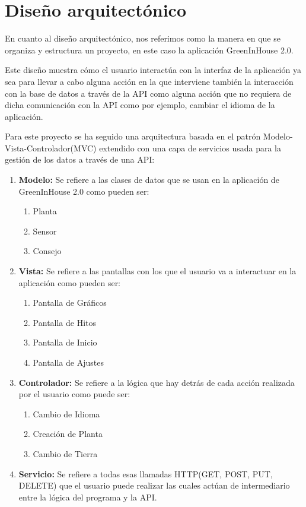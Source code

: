 \section{Diseño arquitectónico}
En cuanto al diseño arquitectónico, nos referimos como la manera en que se organiza y estructura un proyecto, en este caso la aplicación GreenInHouse 2.0.

Este diseño muestra cómo el usuario interactúa con la interfaz de la aplicación ya sea para llevar a cabo alguna acción en la que interviene también la interacción con la base de datos a través de la API como alguna acción que no requiera de dicha comunicación con la API como por ejemplo, cambiar el idioma de la aplicación.

Para este proyecto se ha seguido una arquitectura basada en el patrón Modelo-Vista-Controlador(MVC) extendido con una capa de servicios usada para la gestión de los datos a través de una API:
\begin{enumerate}
    \item \textbf{Modelo:}
   Se refiere a las clases de datos que se usan en la aplicación de GreenInHouse 2.0 como pueden ser:
    \begin{enumerate}
        \item {Planta}
        \item {Sensor}
        \item {Consejo}
    \end{enumerate}
    \item \textbf{Vista:}
    Se refiere a las pantallas con los que el usuario va a interactuar en la aplicación como pueden ser:
    \begin{enumerate}
        \item {Pantalla de Gráficos}
        \item {Pantalla de Hitos}
        \item {Pantalla de Inicio}
        \item {Pantalla de Ajustes}
    \end{enumerate}
    \item \textbf{Controlador:}
    Se refiere a la lógica que hay detrás de cada acción realizada por el usuario como puede ser:
    \begin{enumerate}
        \item {Cambio de Idioma}
        \item {Creación de Planta}
        \item {Cambio de Tierra}
    \end{enumerate}
    \item \textbf{Servicio:}
    Se refiere a todas esas llamadas HTTP(GET, POST, PUT, DELETE) que el usuario puede realizar las cuales actúan de intermediario entre la lógica del programa y la API.
\end{enumerate} 

